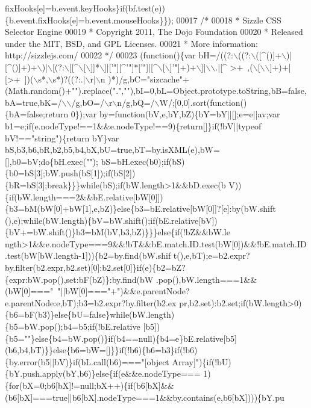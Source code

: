 \begin{DoxyCode}
      fixHooks[e]=b.event.keyHooks\}\textcolor{keywordflow}{if}(bf.test(e))\{b.event.fixHooks[e]=b.event.mouseHooks\}\});
00017 \textcolor{comment}{/*}
00018 \textcolor{comment}{ * Sizzle CSS Selector Engine}
00019 \textcolor{comment}{ *  Copyright 2011, The Dojo Foundation}
00020 \textcolor{comment}{ *  Released under the MIT, BSD, and GPL Licenses.}
00021 \textcolor{comment}{ *  More information: http://sizzlejs.com/}
00022 \textcolor{comment}{ */}
00023 (\textcolor{keyword}{function}()\{var bH=/((?:\(\backslash\)((?:\(\backslash\)([^()]+\(\backslash\))|[^()]+)+\(\backslash\))|\(\backslash\)[(?:\(\backslash\)[[^\(\backslash\)[\(\backslash\)]]*\(\backslash\)]|[\textcolor{stringliteral}{'"][^'}\textcolor{stringliteral}{"]*['"}]|[^\(\backslash\)[\(\backslash\)]\textcolor{stringliteral}{'"]+)+\(\backslash\)]|\(\backslash\)\(\backslash\).|[^
       >+~,(\(\backslash\)[\(\backslash\)\(\backslash\)]+)+|[>+~])(\(\backslash\)s*,\(\backslash\)s*)?((?:.|\(\backslash\)r|\(\backslash\)n
      )*)/g,bC="sizcache"+(Math.random()+"").replace(".",""),bI=0,bL=Object.prototype.toString,bB=false,bA=true,bK=/\(\backslash\)\(\backslash\)/g,bO=/\(\backslash\)r\(\backslash\)n/g,bQ=/\(\backslash\)W/;[0,0].sort(function()\{bA=false;return
       0\});var by=function(bV,e,bY,bZ)\{bY=bY||[];e=e||av;var
       b1=e;if(e.nodeType!==1&&e.nodeType!==9)\{return[]\}if(!bV||typeof bV!=="string")\{return bY\}var
       bS,b3,b6,bR,b2,b5,b4,bX,bU=true,bT=by.isXML(e),bW=[],b0=bV;do\{bH.exec("");
      bS=bH.exec(b0);if(bS)\{b0=bS[3];bW.push(bS[1]);if(bS[2])\{bR=bS[3];break\}\}\}while(bS);if(bW.length>1&&bD.exec(b
      V))\{if(bW.length===2&&bE.relative[bW[0]])\{b3=bM(bW[0]+bW[1],e,bZ)\}else\{b3=bE.relative[bW[0]]?[e]:by(bW.shift
      (),e);while(bW.length)\{bV=bW.shift();if(bE.relative[bV])\{bV+=bW.shift()\}b3=bM(bV,b3,bZ)\}\}\}else\{if(!bZ&&bW.le
      ngth>1&&e.nodeType===9&&!bT&&bE.match.ID.test(bW[0])&&!bE.match.ID.test(bW[bW.length-1]))\{b2=by.find(bW.shif
      t(),e,bT);e=b2.expr?by.filter(b2.expr,b2.set)[0]:b2.set[0]\}if(e)\{b2=bZ?\{expr:bW.pop(),set:bF(bZ)\}:by.find(bW
      .pop(),bW.length===1&&(bW[0]==="~"||bW[0]==="+")&&e.parentNode?e.parentNode:e,bT);b3=b2.expr?by.filter(b2.ex
      pr,b2.set):b2.set;if(bW.length>0)\{b6=bF(b3)\}else\{bU=false\}while(bW.length)\{b5=bW.pop();b4=b5;if(!bE.relative
      [b5])\{b5=""\}else\{b4=bW.pop()\}if(b4==null)\{b4=e\}bE.relative[b5](b6,b4,bT)\}\}else\{b6=bW=[]\}\}if(!b6)\{b6=b3\}if(!b6)\{by.error(b5||bV)\}if(bL.call(b6)==="[object
       Array]")\{if(!bU)\{bY.push.apply(bY,b6)\}else\{if(e&&e.nodeType===
      1)\{for(bX=0;b6[bX]!=null;bX++)\{if(b6[bX]&&(b6[bX]===true||b6[bX].nodeType===1&&by.contains(e,b6[bX])))\{bY.pu
}
\end{DoxyCode}
